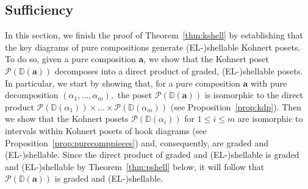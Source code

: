 \documentclass[letterpaper,10pt]{article}
\begin{document}

\subsection{Sufficiency}

In this section, we finish the proof of Theorem~\ref{thm:kshell} by establishing that the key diagrams of pure compositions generate (EL-)shellable Kohnert posets. To do so, given a pure composition $\mathbf{a}$, we show that the Kohnert poset $\mathcal{P}(\mathbb{D}(\mathbf{a}))$ decomposes into a direct product of graded, (EL-)shellable posets. In particular, we start by showing that, for a pure composition $\mathbf{a}$ with pure decomposition $(\alpha_1,\dots,\alpha_m),$ the poset $\mathcal{P}(\mathbb{D}(\mathbf{a}))$ is isomorphic to the direct product $\mathcal{P}(\mathbb{D}(\alpha_1))\times\dots\times\mathcal{P}(\mathbb{D}(\alpha_m))$ (see Proposition~\ref{prop:kdp}). Then we show that the Kohnert posets $\mathcal{P}(\mathbb{D}(\alpha_i))$ for $1\le i\le m$ are isomorphic to intervals within Kohnert posets of hook diagrams (see Proposition~\ref{prop:purecomppieces}) and, consequently, are graded and (EL-)shellable. Since the direct product of graded and (EL-)shellable is graded and (EL-)shellable by Theorem~\ref{thm:pshell} below, it will follow that $\mathcal{P}(\mathbb{D}(\mathbf{a}))$ is graded and (EL-)shellable.
\end{document}
